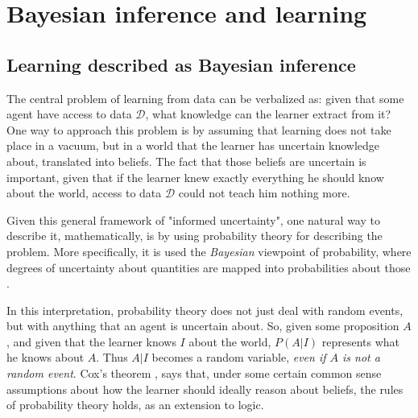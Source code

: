 \chapter{Bayesian inference and learning}

\section{Learning described as Bayesian inference}

The central problem of learning from data can be verbalized as: given that some agent have access to data $\mathcal{D}$, what knowledge can the learner extract from it? One way to approach this problem is by assuming that learning does not take place in a vacuum, but in a world that the learner has uncertain knowledge about, translated into beliefs. The fact that those beliefs are uncertain is important, given that if the learner knew exactly everything he should know about the world, access to data $\mathcal{D}$ could not teach him nothing more.

Given this general framework of "informed uncertainty", one natural way to describe it, mathematically, is by using probability theory for describing the problem. More specifically, it is used the \textit{Bayesian} viewpoint of probability, where degrees of uncertainty about quantities are mapped into probabilities about those \cite{MacKay2003,jaynes03}.

In this interpretation, probability theory does not just deal with random events, but with anything that an agent is uncertain about. So, given some proposition $A$, and given that the learner knows $I$ about the world, $P(A|I)$ represents what he knows about $A$. Thus $A|I$ becomes a random variable, \textit{even if $A$ is not a random event}. Cox's theorem \cite{jaynes03},\cite{Cox_1963} says that, under some certain common sense assumptions about how the learner should ideally reason about beliefs, the rules of probability theory holds, as an extension to logic.

